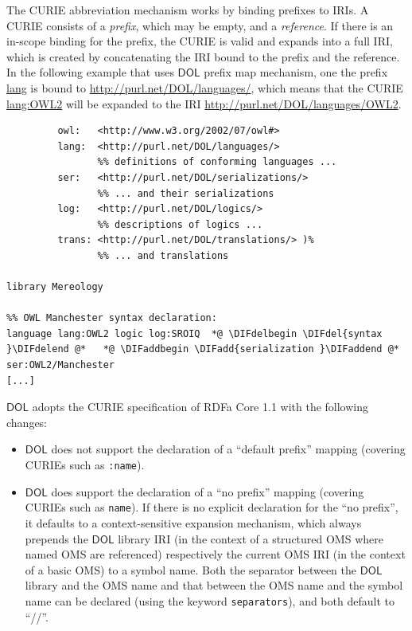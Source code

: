 \documentclass[10pt,fleqn,final]{scrreprt}
\makeatletter
\newcommand*\CommentAuthor{}
\renewcommand*\CommentAuthor{#1}}
\newcommand*\CommentDate{}
\renewcommand*\CommentDate{#1}}
\newcommand*\CommentId{}
\renewcommand*\CommentId{#1}}
\newcommand*\CommentType{}
\renewcommand*\CommentType{#1}}
\newcommand*{\SetCommentColorByType}[1]{%
\edef\localType{{#1}}%
\expandafter\ifstrequal\localType{q-aut}{\colorlet{CommentColor}{red}}{%
\expandafter\ifstrequal\localType{q-all}{\colorlet{CommentColor}{orange}}{%
\expandafter\ifstrequal\localType{todo}{\colorlet{CommentColor}{orange}}{%
\expandafter\ifstrequal\localType{fyi}{\colorlet{CommentColor}{lightgray}}{%
\colorlet{CommentColor}{yellow}}}}}}
\newcommand*{\SetCommentPrefixByType}[1]{%
\edef\localType{{#1}}%
\expandafter\@ifmtarg\localType{%
\edef\CommentPrefix{}%
}{%
\caseupper[q]{#1}%
\edef\CommentPrefix{\thestring: }%
}}
\newcommand*{\initComment}[1]{%
\setkeys{Comment}{#1}%
\SetCommentColorByType{\CommentType}%
\relax%
\SetCommentPrefixByType{\CommentType}%
\relax%
}
\newcommand*{\todonote}[2][]{%
\initComment{#1}%
\pdfcomment[author=\CommentAuthor,color=CommentColor,date=\CommentDate,id=\CommentId]{%
\CommentPrefix
#2}}
\renewcommand*{\todonote}[2][]{%
\initComment{#1}%
\ednote{\CommentPrefix #2}}
\newcommand*{\CLnote}[2][author=Christoph Lange]{%
\todonote[author=Christoph Lange,#1]{#2} 
}
\newcommand*{\syntax}[1]{\texttt{#1}}
\newcommand*{\DOL}{\ensuremath{\mathsf{DOL}}\xspace}
\newcommand{\noterefname}{note}
\newcommand{\nref}[1]{\noterefname~\ref{#1}}
\renewcommand{\nref}[1]{\ref{nref-#1}} %
\newenvironment{definitions}[0]{\medskip }{}
\providecommand{\DIFadd}[1]{{\protect\color{blue}\uwave{#1}}} %
\providecommand{\DIFdel}[1]{{\protect\color{red}\sout{#1}}}                      %
\providecommand{\DIFaddbegin}{} %
\providecommand{\DIFaddend}{} %
\providecommand{\DIFdelbegin}{} %
\providecommand{\DIFdelend}{} %
\makeatother
\begin{document}
\begin{definitions}
The CURIE abbreviation mechanism works by binding prefixes to IRIs.  A CURIE consists of a 
\emph{prefix}, which may be empty, and a \emph{reference}.  If there is an in-scope binding for the 
prefix, the CURIE is valid and expands into a full IRI, which is created by concatenating the IRI 
bound to the prefix and the reference.  In the following example that uses \DOL prefix map mechanism, one the prefix \url{lang} is bound to \url{http://purl.net/DOL/languages/}, which
means that the CURIE \url{lang:OWL2} will be expanded to the IRI
\url{http://purl.net/DOL/languages/OWL2}.

\begin{lstlisting}[basicstyle=\ttfamily,language=dolText,escapechar=@,mathescape]
%prefix( :      <http://www.example.org/mereology#>
         owl:   <http://www.w3.org/2002/07/owl#>
         lang:  <http://purl.net/DOL/languages/>
                %% definitions of conforming languages ...
         ser:   <http://purl.net/DOL/serializations/>
                %% ... and their serializations
         log:   <http://purl.net/DOL/logics/>
                %% descriptions of logics ...
         trans: <http://purl.net/DOL/translations/> )%
                %% ... and translations

library Mereology

%% OWL Manchester syntax declaration: 
language lang:OWL2 logic log:SROIQ  *@ \DIFdelbegin \DIFdel{syntax }\DIFdelend @*   *@ \DIFaddbegin \DIFadd{serialization }\DIFaddend @*  ser:OWL2/Manchester
[...]
\end{lstlisting}


\DOL adopts the CURIE specification of RDFa Core 1.1 \DIFdelbegin %
\DIFdelend \DIFaddbegin \DIFadd{\nref{RDFa}, Section 6 }\DIFaddend with the following changes:
\begin{itemize}
\item \DOL does not support the declaration of a ``default prefix'' mapping %
(covering CURIEs such as \syntax{:name}).
\item \DOL does support the declaration  of a ``no prefix'' mapping (covering CURIEs such as 
\syntax{name}). If there is no explicit declaration for the ``no prefix'', it defaults to a 
context-sensitive expansion mechanism, which always prepends the \DOL library IRI (in the context of a 
structured OMS where named OMS are referenced) respectively the current OMS IRI (in the context of a basic
OMS) to a symbol name. Both the separator between the \DOL library and the OMS name and that between the 
OMS name and the symbol name can be declared (using the keyword \syntax{separators}), and both default to ``//''.


\end{itemize}
\end{definitions}
\end{document}

